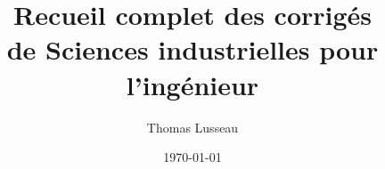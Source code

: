 \documentclass[11pt,a4paper,openany]{book}
\begin{document}
\frontmatter
\title{Recueil complet des corrigés\\de Sciences industrielles pour l'ingénieur}
\author{Thomas Lusseau}
\date{\today}
\maketitle
\tableofcontents
\mainmatter
\newcommand{\repExo}{ALL_EXOS}
\newcommand{\nomExo}{ALL_EXOS}
\proffalse
\livrettrue
\collefalse
\normaltrue

\end{document}
